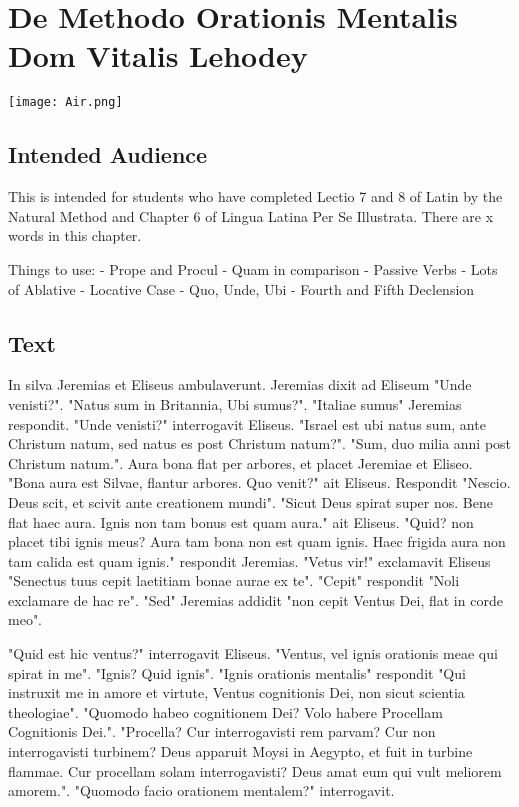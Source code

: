\chapter{De Methodo Orationis Mentalis Dom Vitalis Lehodey}
\begin{center}
\texttt{[image: Air.png]}
\end{center}

\section{Intended Audience}
This is intended for students who have completed Lectio 7 and 8 of Latin by the Natural Method and Chapter 6 of Lingua Latina Per Se Illustrata. There are x words in this chapter.

Things to use:
	- Prope and Procul
	- Quam in comparison
	- Passive Verbs
	- Lots of Ablative
	- Locative Case 
	- Quo, Unde, Ubi
	- Fourth and Fifth Declension

\section{Text}
In silva Jeremias et Eliseus ambulaverunt. Jeremias dixit ad Eliseum "Unde venisti?". "Natus sum in Britannia, Ubi sumus?". "Italiae sumus" Jeremias respondit. "Unde venisti?" interrogavit Eliseus. "Israel est ubi natus sum, ante Christum natum, sed natus es post Christum natum?". "Sum, duo milia anni post Christum natum.". Aura bona flat per arbores, et placet Jeremiae et Eliseo. "Bona aura est Silvae, flantur arbores.  Quo venit?" ait Eliseus. Respondit "Nescio. Deus scit, et scivit ante creationem mundi". "Sicut Deus spirat super nos.  Bene flat haec aura. Ignis non tam bonus est quam aura." ait Eliseus. "Quid? non placet tibi ignis meus? Aura tam bona non est quam ignis. Haec frigida aura non tam calida est quam ignis." respondit Jeremias. "Vetus vir!" exclamavit Eliseus "Senectus tuus cepit laetitiam bonae aurae ex te". "Cepit" respondit "Noli exclamare de hac re". "Sed" Jeremias addidit "non cepit Ventus Dei, flat in corde meo". 

"Quid est hic ventus?" interrogavit Eliseus. "Ventus, vel ignis orationis meae qui spirat in me". "Ignis? Quid ignis". "Ignis orationis mentalis" respondit "Qui instruxit me in amore et virtute, Ventus cognitionis Dei, non sicut scientia theologiae". "Quomodo habeo cognitionem Dei? Volo habere Procellam Cognitionis Dei.". "Procella? Cur interrogavisti rem parvam? Cur non interrogavisti turbinem? Deus apparuit Moysi in Aegypto, et fuit in turbine flammae. Cur procellam solam interrogavisti? Deus amat eum qui vult meliorem amorem.". "Quomodo facio orationem mentalem?" interrogavit. 

